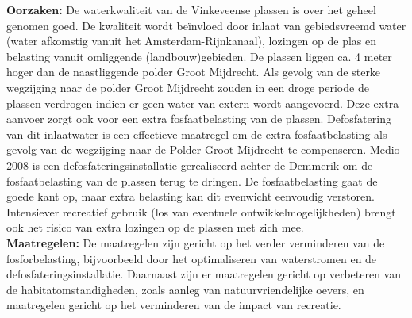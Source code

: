 \documentclass[12pt]{article}\usepackage[]{graphicx}\usepackage[]{color}
\begin{document}
\begin{tcbposter}
{    %
    \textbf{Oorzaken:} De waterkwaliteit van de Vinkeveense plassen is over het geheel genomen goed. De kwaliteit wordt beïnvloed door inlaat van gebiedsvreemd water (water afkomstig vanuit het Amsterdam-Rijnkanaal), lozingen op de plas en belasting vanuit omliggende (landbouw)gebieden. De plassen liggen ca. 4 meter hoger dan de naastliggende polder Groot Mijdrecht. Als gevolg van de sterke wegzijging naar de polder Groot Mijdrecht zouden in een droge periode de plassen verdrogen indien er geen water van extern wordt aangevoerd. Deze extra aanvoer zorgt ook voor een extra fosfaatbelasting van de plassen. Defosfatering van dit inlaatwater is een effectieve maatregel om de extra fosfaatbelasting als gevolg van de wegzijging naar de Polder Groot Mijdrecht te compenseren. Medio 2008 is een defosfateringsinstallatie gerealiseerd achter de Demmerik om de fosfaatbelasting van de plassen terug te dringen. De fosfaatbelasting gaat de goede kant op, maar extra belasting kan dit evenwicht eenvoudig verstoren. Intensiever recreatief gebruik (los van eventuele ontwikkelmogelijkheden) brengt ook het risico van extra lozingen op de plassen met zich mee.\\
    
    \textbf{Maatregelen:} De maatregelen zijn gericht op het verder verminderen van de fosforbelasting, bijvoorbeeld door het optimaliseren van waterstromen en de defosfateringsinstallatie. Daarnaast zijn er maatregelen gericht op verbeteren van de habitatomstandigheden, zoals aanleg van natuurvriendelijke oevers, en maatregelen gericht op het verminderen van de impact van recreatie.\\
  }
  
  \end{tcbposter}
  
\end{document}
